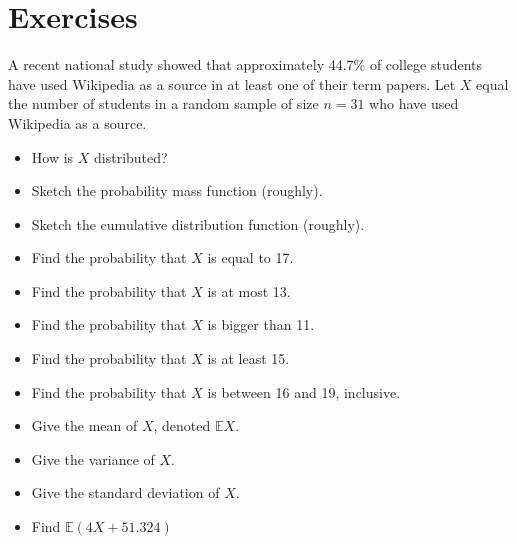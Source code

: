\documentclass[captions=tableheading]{scrbook}
\begin{document}
\newpage{}
\section{Exercises}
\label{sec-5-8}

\setcounter{thm}{0}

\begin{xca}
A recent national study showed that approximately 44.7\% of college students have used Wikipedia as a source in at least one of their term papers. Let \(X\) equal the number of students in a random sample of size \(n=31\) who have used Wikipedia as a source. 
\begin{itemize}
\item How is \(X\) distributed?
\item Sketch the probability mass function (roughly).
\item Sketch the cumulative distribution function (roughly).
\item Find the probability that \(X\) is equal to 17.
\item Find the probability that \(X\) is at most 13.
\item Find the probability that \(X\) is bigger than 11.
\item Find the probability that \(X\) is at least 15.
\item Find the probability that \(X\) is between 16 and 19, inclusive.
\item Give the mean of \(X\), denoted \(\mathbb{E} X\).
\item Give the variance of \(X\).
\item Give the standard deviation of \(X\).
\item Find \(\mathbb{E}(4X+51.324)\)
\end{itemize}

\end{xca}
\end{document}
